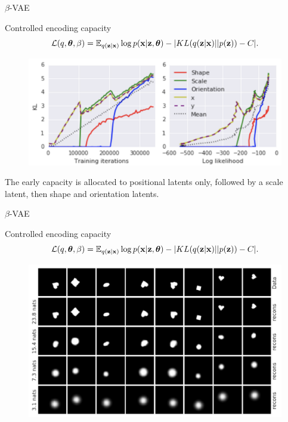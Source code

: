 \begin{frame}{$\beta$-VAE}
	\begin{block}{Controlled encoding capacity}
		\vspace{-0.5cm}
		\[
		\mathcal{L}(q, \boldsymbol{\theta}, \beta) = \mathbb{E}_{q(\mathbf{z} | \mathbf{x})} \log p(\mathbf{x} | \mathbf{z}, \boldsymbol{\theta}) - | KL (q(\mathbf{z} | \mathbf{x}) || p(\mathbf{z})) - C|.
		\]
	\end{block}
	\begin{figure}
		\centering
		\includegraphics[width=0.9\linewidth]{figs/betaVAE_7.png}
	\end{figure}
	The early capacity is allocated to positional latents only, followed by a scale latent, then shape and orientation latents.
	
\end{frame}
\begin{frame}{$\beta$-VAE}
	\begin{block}{Controlled encoding capacity}
		\vspace{-0.5cm}
		\[
		\mathcal{L}(q, \boldsymbol{\theta}, \beta) = \mathbb{E}_{q(\mathbf{z} | \mathbf{x})} \log p(\mathbf{x} | \mathbf{z}, \boldsymbol{\theta}) - | KL (q(\mathbf{z} | \mathbf{x}) || p(\mathbf{z})) - C|.
		\]
		\vspace{-0.5cm}
	\end{block}
	\begin{figure}
		\centering
		\includegraphics[width=0.7\linewidth]{figs/betaVAE_8.png}
	\end{figure}
	
\end{frame}
